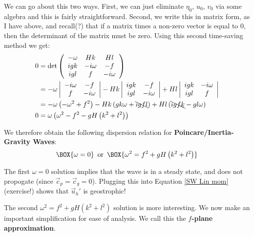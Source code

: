 We can go about this two ways. First, we can just eliminate $\eta_0$, $u_0$, $v_0$ via some algebra and this is fairly straightforward. Second, we write this in matrix form, as I have above, and recall(?) that if a matrix times a non-zero vector is equal to 0, then the determinant of the matrix must be zero. Using this second time-saving method we get:
\begin{align*}
   0 &=\det\left( \begin{array}{ccc}
        -\omega & Hk & Hl \\
        igk & -i\omega & -f\\
        igl & f & -i\omega
    \end{array} \right)
   \\
   &=-\omega \left|\begin{array}{cc}
        -i\omega & -f\\
        f & -i\omega
    \end{array} \right|
    -Hk \left|\begin{array}{cc}
        igk & -f\\
        igl & -i\omega
    \end{array} \right|
    +Hl \left|\begin{array}{cc}
        igk & -i\omega\\
        igl & f
    \end{array} \right|
    \\
    &=-\omega\left( -\omega^2+f^2 \right)
    -Hk \left( gk\omega +\bcancel{igfl} \right)
    +Hl \left( \bcancel{igfk} -gl\omega \right)
    \\
    0&=\omega\left( \omega^2 - f^2 - gH \left( k^2+l^2 \right) \right)
\end{align*}

We therefore obtain the following dispersion relation for \textbf{Poincare/Inertia-Gravity Waves}:
\begin{align}
    \BOX{\omega=0}\,\text{ or }\,\BOX{\omega^2 = f^2 + gH \left( k^2 + l^2 \right)}
\end{align}

The first $\omega=0$ solution implies that the wave is in a steady state, and does not propogate (since $\vec{c}_p=\vec{c}_g=0$). Plugging this into Equation \ref{SW Lin mom} (exercise!) shows that $\vec{u}_h'$ is geostrophic!

The second $\omega^2=f^2+gH\left( k^2+l^2 \right)$ solution is more interesting. We now make an important simplification for ease of analysis. We call this the \textbf{$f$-plane approximation}.

